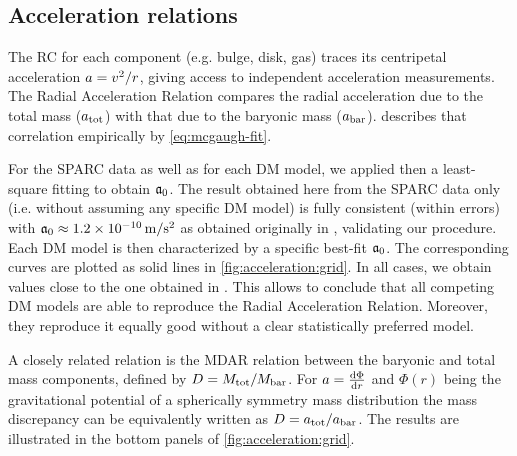 
\subsection{Acceleration relations}
\label{sec:result:ac}

The RC for each component (e.g. bulge, disk, gas) traces its centripetal acceleration $a = v^2/r$, giving access to independent acceleration measurements. The Radial Acceleration Relation compares the radial acceleration due to the total mass ($a_\mathrm{tot}$) with that due to the baryonic mass ($a_\mathrm{bar}$). \citet{2016PhRvL.117t1101M} describes that correlation empirically by \cref{eq:mcgaugh-fit}.


For the SPARC data as well as for each DM model, we applied then a least-square fitting to obtain $\mathfrak{a}_0$. The result obtained here from the SPARC data only (i.e. without assuming any specific DM model) is fully consistent (within errors) with $\mathfrak{a}_0 \approx \SI{1.2E-10}{\metre\per\second^2}$ as obtained originally in \citet{2016PhRvL.117t1101M}, validating our procedure. Each DM model is then characterized by a specific best-fit $\mathfrak{a}_0$. The corresponding curves are plotted as solid lines in \cref{fig:acceleration:grid}. In all cases, we obtain values close to the one obtained in \citet{2016PhRvL.117t1101M}. This allows to conclude that all competing DM models are able to reproduce the Radial Acceleration Relation. Moreover, they reproduce it equally good without a clear statistically preferred model.

A closely related relation is the MDAR relation between the baryonic and total mass components, defined by $D = M_{\rm tot}/M_{\rm bar}$.  For $a = \frac{\mathrm{d}\Phi}{\mathrm{d} r}$ and $\Phi(r)$ being the gravitational potential of a spherically symmetry mass distribution the mass discrepancy can be equivalently written as $D = a_\mathrm{tot}/a_\mathrm{bar}$. The results are illustrated in the bottom panels of \cref{fig:acceleration:grid}.

